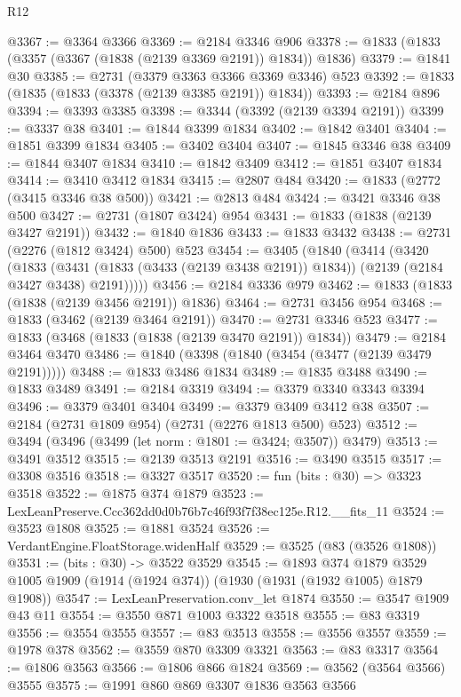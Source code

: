 \begin{lexlean}{R12}
\begin{coremodule}
@3367 := @3364 @3366
@3369 := @2184 @3346 @906
@3378 := @1833 (@1833 (@3357 (@3367 (@1838 (@2139 @3369 @2191)) @1834)) @1836)
@3379 := @1841 @30
@3385 := @2731 (@3379 @3363 @3366 @3369 @3346) @523
@3392 := @1833 (@1835 (@1833 (@3378 (@2139 @3385 @2191)) @1834))
@3393 := @2184 @896
@3394 := @3393 @3385
@3398 := @3344 (@3392 (@2139 @3394 @2191))
@3399 := @3337 @38
@3401 := @1844 @3399 @1834
@3402 := @1842 @3401
@3404 := @1851 @3399 @1834
@3405 := @3402 @3404
@3407 := @1845 @3346 @38
@3409 := @1844 @3407 @1834
@3410 := @1842 @3409
@3412 := @1851 @3407 @1834
@3414 := @3410 @3412 @1834
@3415 := @2807 @484
@3420 := @1833 (@2772 (@3415 @3346 @38 @500))
@3421 := @2813 @484
@3424 := @3421 @3346 @38 @500
@3427 := @2731 (@1807 @3424) @954
@3431 := @1833 (@1838 (@2139 @3427 @2191))
@3432 := @1840 @1836
@3433 := @1833 @3432
@3438 := @2731 (@2276 (@1812 @3424) @500) @523
@3454 := @3405
    (@1840
      (@3414
        (@3420
          (@1833
            (@3431 (@1833 (@3433 (@2139 @3438 @2191)) @1834))
            (@2139 (@2184 @3427 @3438) @2191)))))
@3456 := @2184 @3336 @979
@3462 := @1833 (@1833 (@1838 (@2139 @3456 @2191)) @1836)
@3464 := @2731 @3456 @954
@3468 := @1833 (@3462 (@2139 @3464 @2191))
@3470 := @2731 @3346 @523
@3477 := @1833 (@3468 (@1833 (@1838 (@2139 @3470 @2191)) @1834))
@3479 := @2184 @3464 @3470
@3486 := @1840 (@3398 (@1840 (@3454 (@3477 (@2139 @3479 @2191)))))
@3488 := @1833 @3486 @1834
@3489 := @1835 @3488
@3490 := @1833 @3489
@3491 := @2184 @3319
@3494 := @3379 @3340 @3343 @3394
@3496 := @3379 @3401 @3404
@3499 := @3379 @3409 @3412 @38
@3507 := @2184 (@2731 @1809 @954) (@2731 (@2276 @1813 @500) @523)
@3512 := @3494 (@3496 (@3499 (let norm : @1801 := @3424; @3507)) @3479)
@3513 := @3491 @3512
@3515 := @2139 @3513 @2191
@3516 := @3490 @3515
@3517 := @3308 @3516
@3518 := @3327 @3517
@3520 := fun (bits : @30) => @3323 @3518
@3522 := @1875 @374 @1879
@3523 := LexLeanPreserve.Ccc362dd0d0b76b7c46f93f7f38ec125e.R12.__fits_11
@3524 := @3523 @1808
@3525 := @1881 @3524
@3526 := VerdantEngine.FloatStorage.widenHalf
@3529 := @3525 (@83 (@3526 @1808))
@3531 := (bits : @30) -> @3522 @3529
@3545 := @1893
    @374
    @1879
    @3529
    @1005
    @1909
    (@1914 (@1924 @374))
    (@1930 (@1931 (@1932 @1005) @1879 @1908))
@3547 := LexLeanPreservation.conv_let @1874
@3550 := @3547 @1909 @43 @11
@3554 := @3550 @871 @1003 @3322 @3518
@3555 := @83 @3319
@3556 := @3554 @3555
@3557 := @83 @3513
@3558 := @3556 @3557
@3559 := @1978 @378
@3562 := @3559 @870 @3309 @3321
@3563 := @83 @3317
@3564 := @1806 @3563
@3566 := @1806 @866 @1824
@3569 := @3562 (@3564 @3566) @3555
@3575 := @1991 @860 @869 @3307 @1836 @3563 @3566

\end{coremodule}
\end{lexlean}
